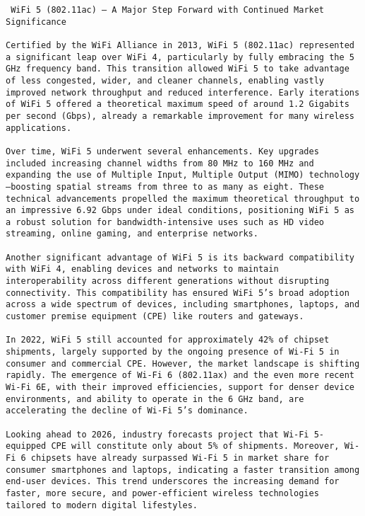 \begin{verbatim}
 WiFi 5 (802.11ac) – A Major Step Forward with Continued Market Significance

Certified by the WiFi Alliance in 2013, WiFi 5 (802.11ac) represented a significant leap over WiFi 4, particularly by fully embracing the 5 GHz frequency band. This transition allowed WiFi 5 to take advantage of less congested, wider, and cleaner channels, enabling vastly improved network throughput and reduced interference. Early iterations of WiFi 5 offered a theoretical maximum speed of around 1.2 Gigabits per second (Gbps), already a remarkable improvement for many wireless applications.

Over time, WiFi 5 underwent several enhancements. Key upgrades included increasing channel widths from 80 MHz to 160 MHz and expanding the use of Multiple Input, Multiple Output (MIMO) technology—boosting spatial streams from three to as many as eight. These technical advancements propelled the maximum theoretical throughput to an impressive 6.92 Gbps under ideal conditions, positioning WiFi 5 as a robust solution for bandwidth-intensive uses such as HD video streaming, online gaming, and enterprise networks.

Another significant advantage of WiFi 5 is its backward compatibility with WiFi 4, enabling devices and networks to maintain interoperability across different generations without disrupting connectivity. This compatibility has ensured WiFi 5’s broad adoption across a wide spectrum of devices, including smartphones, laptops, and customer premise equipment (CPE) like routers and gateways.

In 2022, WiFi 5 still accounted for approximately 42% of chipset shipments, largely supported by the ongoing presence of Wi-Fi 5 in consumer and commercial CPE. However, the market landscape is shifting rapidly. The emergence of Wi-Fi 6 (802.11ax) and the even more recent Wi-Fi 6E, with their improved efficiencies, support for denser device environments, and ability to operate in the 6 GHz band, are accelerating the decline of Wi-Fi 5’s dominance.

Looking ahead to 2026, industry forecasts project that Wi-Fi 5-equipped CPE will constitute only about 5% of shipments. Moreover, Wi-Fi 6 chipsets have already surpassed Wi-Fi 5 in market share for consumer smartphones and laptops, indicating a faster transition among end-user devices. This trend underscores the increasing demand for faster, more secure, and power-efficient wireless technologies tailored to modern digital lifestyles.



\end{verbatim}

